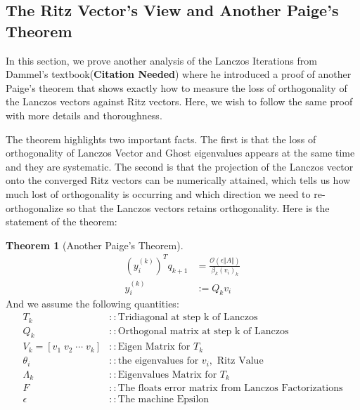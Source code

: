 \documentclass[]{article}
\theoremstyle{definition}
\newtheorem{theorem}{Theorem}            %
\begin{document}
    \subsection{The Ritz Vector's View and Another Paige's Theorem}
        In this section, we prove another analysis of the Lanczos Iterations from Dammel's textbook(\textbf{Citation Needed}) where he introduced a proof of another Paige's theorem that shows exactly how to measure the loss of orthogonality of the Lanczos vectors against Ritz vectors. Here, we wish to follow the same proof with more details and thoroughness.
        \par
        The theorem highlights two important facts. The first is that the loss of orthogonality of Lanczos Vector and Ghost eigenvalues appears at the same time and they are systematic. The second is that the projection of the Lanczos vector onto the converged Ritz vectors can be numerically attained, which tells us how much lost of orthogonality is occurring and which direction we need to re-orthogonalize so that the Lanczos vectors retains orthogonality. Here is the statement of the theorem: 
        \begin{theorem}[Another Paige's Theorem]
            \begin{align}
                (y_i^{(k)})^Tq_{k + 1} &= \frac{\mathcal O(\epsilon \Vert A\Vert)}{\beta_k (v_i)_k}    
                \\
                y_i^{(k)} &:= Q_kv_i
            \end{align}
            And we assume the following quantities: 
            \begin{align}
                T_k &:: \text{Tridiagonal at step k of Lanczos}
                \\
                Q_k &:: \text{Orthogonal matrix at step k of Lanczos}
                \\
                V_k = [v_1\;  v_2\; \cdots \; v_k] &:: \text{Eigen Matrix for } T_k
                \\
                \theta_i &:: \text{the eigenvalues for }v_i, \text{ Ritz Value}
                \\
                \Lambda_k &:: \text{Eigenvalues Matrix for }T_k
                \\
                F &::\text{The floats error matrix from Lanczos Factorizations}
                \\
                \epsilon &:: \text{The machine Epsilon}
            \end{align}

        \end{theorem}
\end{document}
